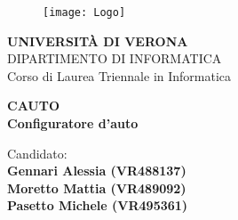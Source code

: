 \begin{titlepage}
    \begin{figure}[htb]
        \centering
        \texttt{[image: Logo]}
        \vspace{2mm}
    \end{figure}
    
    \begin{center}
        \LARGE{\bf UNIVERSITÀ DI VERONA}
        \vspace{2mm}
        \\ \large{DIPARTIMENTO DI INFORMATICA }
        \vspace{5mm}
        \\ \LARGE{Corso di Laurea Triennale in Informatica}
    \end{center}
    
    \vspace{15mm}
    \begin{center}
        {\LARGE{\bf CAUTO\\\vspace{5mm}Configuratore d'auto}}
    \end{center}
    \vspace{20mm}
    
    \begin{center}
        {\large{Candidato:\\}
            \large\bf{
                Gennari Alessia (VR488137)\\ 
                \vspace{1mm}
                Moretto Mattia (VR489092)\\ 
                \vspace{1mm}
                Pasetto Michele (VR495361)\\
            }
        }
    \end{center}
    
    \vspace{\fill}
    
    \end{titlepage}